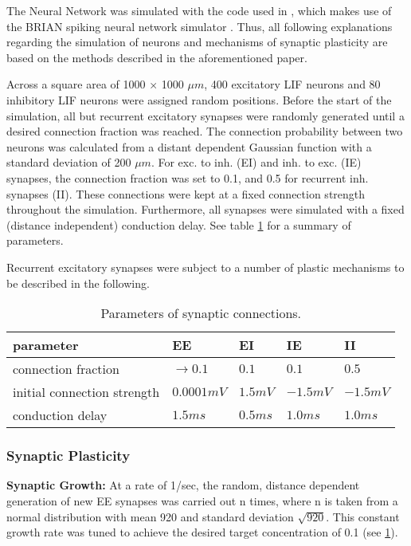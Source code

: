 \documentclass[10pt,a4paper]{article}
\begin{document}
The Neural Network was simulated with the code used in \cite{SORN_Paper}, which makes use of the BRIAN spiking neural network simulator \cite{Briansim}. Thus, all following explanations regarding the simulation of neurons and mechanisms of synaptic plasticity are based on the methods described in the aforementioned paper.

Across a square area of 1000 $\times$ 1000 $\mu m$, 400 excitatory LIF neurons and 80 inhibitory LIF neurons were assigned random positions. Before the start of the simulation, all but recurrent excitatory synapses were randomly generated until a desired connection fraction was reached. The connection probability between two neurons was calculated from a distant dependent Gaussian function with a standard deviation of 200 $\mu m$. For exc. to inh. (EI) and inh. to exc. (IE) synapses, the connection fraction was set to 0.1, and 0.5 for recurrent inh. synapses (II). These connections were kept at a fixed connection strength throughout the simulation. Furthermore, all synapses were simulated with a fixed (distance independent) conduction delay. See table \ref{syn_conn_params} for a summary of parameters.

Recurrent excitatory synapses were subject to a number of plastic mechanisms to be described in the following. 

\begin{table}
\begin{tabular}{|l|l|l|l|l|}
\hline
\textbf{parameter} & \textbf{EE} & \textbf{EI} & \textbf{IE} & \textbf{II} \\ \hline
connection fraction & $\rightarrow 0.1$ & $0.1$ & $0.1$ & $0.5$ \\ \hline
initial connection strength & $0.0001 mV$ & $1.5 mV$ & $-1.5 mV$ & $-1.5 mV$ \\ \hline
conduction delay & $1.5 ms$ & $0.5 ms$ & $1.0 ms$ & $1.0 ms$ \\
\hline
\end{tabular}
\caption{Parameters of synaptic connections.}
\label{syn_conn_params}
\end{table}

\subsubsection{Synaptic Plasticity}

\textbf{Synaptic Growth:} At a rate of 1/sec, the random, distance dependent generation of new EE synapses was carried out n times, where n is taken from a normal distribution with mean 920 and standard deviation $\sqrt{920}$. This constant growth rate was tuned to achieve the desired target concentration of 0.1 (see \ref{syn_conn_params}).
\end{document}
